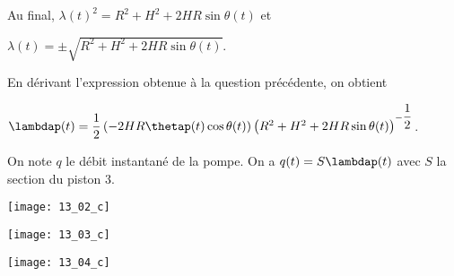 Au final, 
$\lambda(t)^2 =  R^2  +H^2 +2 HR\sin\theta(t)$ et 

$\lambda(t) = \pm\sqrt{ R^2  +H^2 +2 HR\sin\theta(t)}$.
\else
\fi


\ifprof

En dérivant l'expression obtenue à la question précédente, on obtient 

$\lambdap(t) = \dfrac{1}{2}\left(-  2 HR\thetap(t)\cos\theta(t)\right)\left(R^2  +H^2 +2 HR\sin\theta(t)\right)^{-\dfrac{1}{2}}$.


\else
\fi


\ifprof
On note $q$ le débit instantané de la pompe. 
On a $q(t)=S\lambdap(t)$ avec $S$ la section du piston 3. 

\else
\fi


\ifprof

\begin{minipage}[c]{.3\linewidth}
\texttt{[image: 13\_02\_c]}
\end{minipage}
\hfill
\begin{minipage}[c]{.3\linewidth}
\texttt{[image: 13\_03\_c]}
\end{minipage}
\hfill
\begin{minipage}[c]{.3\linewidth}
\texttt{[image: 13\_04\_c]}
\end{minipage}



